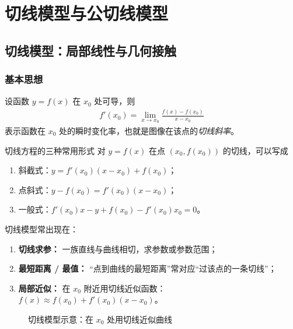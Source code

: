 \documentclass[a4paper,11pt]{ctexart}
\begin{document}
\section{切线模型与公切线模型}

\subsection{切线模型：局部线性与几何接触}

\subsubsection{基本思想}

设函数 $y=f(x)$ 在 $x_0$ 处可导，则
\begin{align*}
  f'(x_0)=\lim_{x\to x_0}\frac{f(x)-f(x_0)}{x-x_0}
\end{align*}
表示函数在 $x_0$ 处的瞬时变化率，也就是图像在该点的\emph{切线斜率}。

\begin{definitionbox}{切线方程的三种常用形式}
  对 $y=f(x)$ 在点 $(x_0,f(x_0))$ 的切线，可以写成
  \begin{enumerate}
    \item 斜截式：$y = f'(x_0)(x-x_0)+f(x_0)$；
    \item 点斜式：$y - f(x_0) = f'(x_0)(x-x_0)$；
    \item 一般式：$f'(x_0)x - y + f(x_0)-f'(x_0)x_0 = 0$。
  \end{enumerate}
\end{definitionbox}

切线模型常出现在：
\begin{enumerate}
  \item \textbf{切线求参：} 一族直线与曲线相切，求参数或参数范围；
  \item \textbf{最短距离 / 最值：} “点到曲线的最短距离”常对应“过该点的一条切线”；
  \item \textbf{局部近似：} 在 $x_0$ 附近用切线近似函数：$f(x)\approx f(x_0)+f'(x_0)(x-x_0)$。
\end{enumerate}

\begin{figure}[htbp]
  \centering
  \caption{切线模型示意：在 $x_0$ 处用切线近似曲线}
\end{figure}
\end{document}
